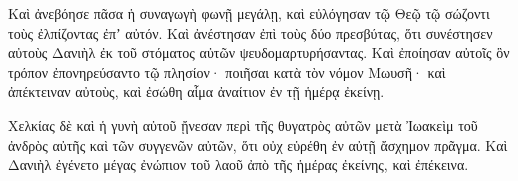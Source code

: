 {\par }{\PP {}Καὶ ἀνεβόησε πᾶσα ἡ συναγωγὴ φωνῇ μεγάλῃ, καὶ εὐλόγησαν τῷ Θεῷ τῷ σώζοντι τοὺς ἐλπίζοντας ἐπʼ αὐτόν.
Καὶ ἀνέστησαν ἐπὶ τοὺς δύο πρεσβύτας, ὅτι συνέστησεν αὐτοὺς Δανιὴλ ἐκ τοῦ στόματος αὐτῶν ψευδομαρτυρήσαντας.
Καὶ ἐποίησαν αὐτοῖς ὃν τρόπον ἐπονηρεύσαντο τῷ πλησίον· ποιῆσαι κατὰ τὸν νόμον Μωυσῆ· καὶ ἀπέκτειναν αὐτοὺς, καὶ ἐσώθη αἷμα ἀναίτιον ἐν τῇ ἡμέρᾳ ἐκείνῃ.
\par }{\PP {}Χελκίας δὲ καὶ ἡ γυνὴ αὐτοῦ ᾔνεσαν περὶ τῆς θυγατρὸς αὐτῶν μετὰ Ἰωακεὶμ τοῦ ἀνδρὸς αὐτῆς καὶ τῶν συγγενῶν αὐτῶν, ὅτι οὐχ εὑρέθη ἐν αὐτῇ ἄσχημον πρᾶγμα.
Καὶ Δανιὴλ ἐγένετο μέγας ἐνώπιον τοῦ λαοῦ ἀπὸ τῆς ἡμέρας ἐκείνης, καὶ ἐπέκεινα.
\par }
